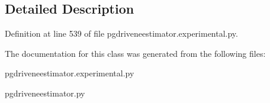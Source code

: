 \subsection{Detailed Description}


Definition at line 539 of file pgdriveneestimator.\+experimental.\+py.



The documentation for this class was generated from the following files\+:\begin{DoxyCompactItemize}
\item 
pgdriveneestimator.\+experimental.\+py\item 
pgdriveneestimator.\+py\end{DoxyCompactItemize}
